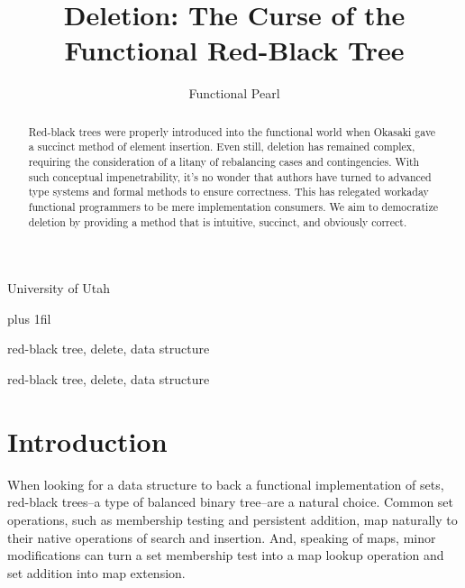 \documentclass[preprint]{sigplanconf}
\begin{document}
\copyrightdata{[to be supplied]} 


\title{Deletion: The Curse of the Functional Red-Black Tree}
\subtitle{Functional Pearl}

           {University of Utah}

\maketitle

\rightcodeskip=0pt plus 1fil 

\begin{abstract}
Red-black trees were properly introduced into the functional world when Okasaki gave a succinct method of element insertion. Even still, deletion has remained complex, requiring the consideration of a litany of rebalancing cases and contingencies. With such conceptual impenetrability, it's no wonder that authors have turned to advanced type systems and formal methods to ensure correctness. This has relegated workaday functional programmers to be mere implementation consumers. We aim to democratize deletion by providing a method that is intuitive, succinct, and obviously correct.
\end{abstract}


\terms
red-black tree, delete, data structure

\keywords
red-black tree, delete, data structure

\section{Introduction}

When looking for a data structure to back a functional implementation of sets, red-black trees--a type of balanced binary tree--are a natural choice. Common set operations, such as membership testing and persistent addition, map naturally to their native operations of search and insertion. And, speaking of maps, minor modifications can turn a set membership test into a map lookup operation and set addition into map extension.
\end{document}
